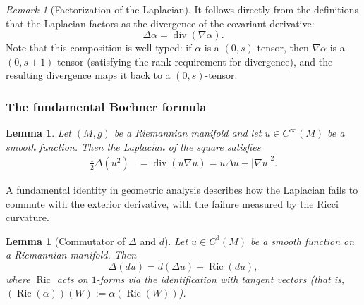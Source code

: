 \documentclass[11pt]{article}
\theoremstyle{plain}
\newtheorem{lemma}[theorem]{Lemma}
\theoremstyle{definition}
\theoremstyle{remark}
\newtheorem{remark}[theorem]{Remark}
\begin{document}
\begin{remark}[Factorization of the Laplacian]
\label{rem:laplacian_div_grad}
    It follows directly from the definitions that the Laplacian factors as the divergence of the covariant derivative:
    \begin{equation}
        \Delta \alpha = \operatorname{div} ( \nabla \alpha ).
    \end{equation}
    Note that this composition is well-typed: if $\alpha$ is a $(0,s)$-tensor, then $\nabla \alpha$ is a $(0,s+1)$-tensor (satisfying the rank requirement for divergence), and the resulting divergence maps it back to a $(0,s)$-tensor.
\end{remark}

\subsubsection{The fundamental Bochner formula}

\begin{lemma}
\label{ex:laplace_u_squared}
Let $(M,g)$ be a Riemannian manifold and let $u\in C^\infty(M)$ be a
smooth function. Then the Laplacian of the square satisfies
    \begin{align}
        \frac{1}{2}\Delta (u^2) &= \operatorname{div}(u\nabla u)
        = u \Delta u + |\nabla u|^2. \label{eq:Laplace_of_u_squared}
    \end{align}
\end{lemma}

A fundamental identity in geometric analysis describes how the Laplacian
fails to commute with the exterior derivative, with the failure measured
by the Ricci curvature.

\begin{lemma}[Commutator of $\Delta$ and $d$]
\label{lem:laplace_d_commutator}
    Let $u \in C^3(M)$ be a smooth function on a Riemannian manifold. Then
    \begin{equation}
        \Delta(du) = d(\Delta u) + \operatorname{Ric}(du),
        \label{eq:Laplace_Nabla_Commutator}
    \end{equation}
    where $\operatorname{Ric}$ acts on $1$-forms via the identification with tangent vectors (that is, $(\operatorname{Ric}(\alpha))(W) := \alpha(\operatorname{Ric}(W))$).
\end{lemma}
\end{document}

